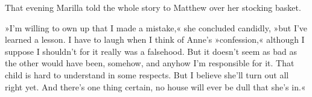 That evening Marilla told the whole story to Matthew over her stocking basket.

»I'm willing to own up that I made a mistake,« she concluded candidly, »but I've learned a lesson. I have to laugh when I think of Anne's »confession,« although I suppose I shouldn't for it really was a falsehood. But it doesn't seem as bad as the other would have been, somehow, and anyhow I'm responsible for it. That child is hard to understand in some respects. But I believe she'll turn out all right yet. And there's one thing certain, no house will ever be dull that she's in.«